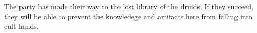 The party has made their way to the lost library of the druids.
If they succeed, they will be able to prevent the knowledege and artifacts here from falling into cult hands.
